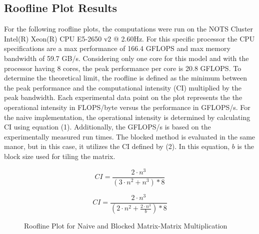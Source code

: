 \documentclass{article}
\begin{document}
\subsection{Roofline Plot Results}

For the following roofline plots, the computations were run on the NOTS Cluster Intel(R) Xeon(R) CPU E5-2650 v2 @ 2.60Hz. For this specific processor the CPU specifications are a max performance of 166.4 GFLOPS and max memory bandwidth of 59.7 GB/s. Considering only one core for this model and with the processor having 8 cores, the peak performance per core is 20.8 GFLOPS. To determine the theoretical limit, the roofline is defined as the minimum between the peak performance and the computational intensity (CI) multiplied by the peak bandwidth. Each experimental data point on the plot represents the the operational intensity in FLOPS/byte versus the performance in GFLOPS/s. For the naive implementation, the operational intensity is determined by calculating CI using equation (1). Additionally, the GFLOPS/s is based on the experimentally measured run times. The blocked method is evaluated in the same manor, but in this case, it utilizes the CI defined by (2). In this equation, \(b \) is the block size used for tiling the matrix.

\begin{equation}
CI = \frac{2 \cdot n^{3}}{(3 \cdot n^{2} + n^{3}) * 8}
\end{equation}

\begin{equation}
CI = \frac{2 \cdot n^{3}}{(2 \cdot n^{2} + \frac{2 \cdot n^{3}}{b}) * 8}
\end{equation}


\begin{figure}[!htb]
    \centering
    \caption{Roofline Plot for Naive and Blocked Matrix-Matrix Multiplication}
\end{figure}
\end{document}
